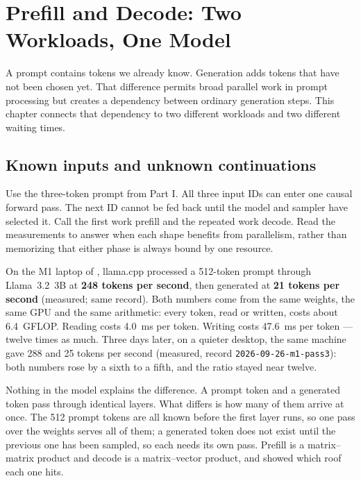 \chapter{Prefill and Decode: Two Workloads, One Model}\label{ch:prefill-decode}

\begin{ChapterIntent}
A prompt contains tokens we already know. Generation adds tokens that have not been
chosen yet. That difference permits broad parallel work in prompt processing but creates
a dependency between ordinary generation steps. This chapter connects that dependency to
two different workloads and two different waiting times.
\end{ChapterIntent}

\section*{Known inputs and unknown continuations}
Use the three-token prompt from Part I. All three input IDs can enter one causal forward
pass. The next ID cannot be fed back until the model and sampler have selected it. Call
the first work prefill and the repeated work decode. Read the measurements to answer
when each shape benefits from parallelism, rather than memorizing that either phase is
always bound by one resource.


On the M1 laptop of , llama.cpp processed a 512-token prompt
through Llama~3.2~3B at \textbf{248 tokens per second}, then generated at
\textbf{21 tokens per second} (measured; same record). Both numbers come from
the same weights, the same GPU and the same arithmetic: every token, read or
written, costs about 6.4~GFLOP. Reading costs 4.0~ms per token. Writing costs
47.6~ms per token --- twelve times as much. Three days later, on a quieter
desktop, the same machine gave 288 and 25 tokens per second (measured, record
\texttt{2026-09-26-m1-pass3}): both numbers rose by a sixth to a fifth, and the
ratio stayed near twelve.

Nothing in the model explains the difference. A prompt token and a generated
token pass through identical layers. What differs is how many of them arrive
at once. The 512 prompt tokens are all known before the first layer runs, so
one pass over the weights serves all of them; a generated token does not exist
until the previous one has been sampled, so each needs its own pass. Prefill
is a matrix--matrix product and decode is a matrix--vector product, and
 showed which roof each one hits.

